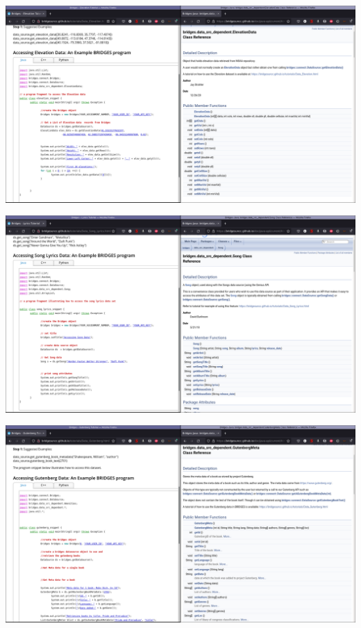 \documentclass[aspectratio=169]{beamer}
\begin{document}
\begin{frame}
  \includegraphics[width=1.02\linewidth]{dataset_figs/Elevation.png}
\end{frame}

\begin{frame}
  \includegraphics[width=1.02\linewidth]{dataset_figs/Song.png}
\end{frame}

\begin{frame}
  \includegraphics[width=1.02\linewidth]{dataset_figs/Gutenberg.png}
\end{frame}
\end{document}
